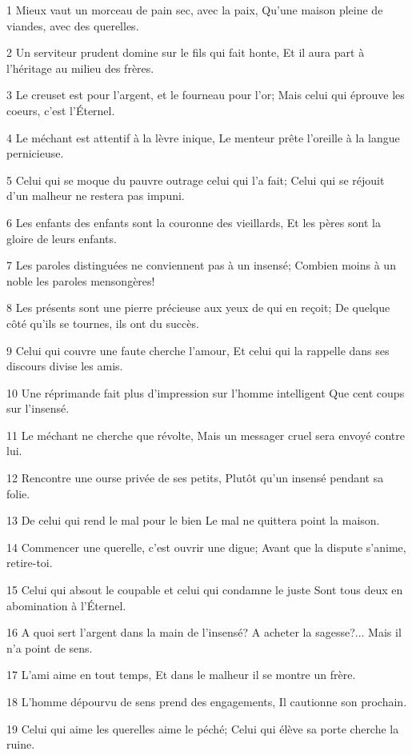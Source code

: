 \par 1 Mieux vaut un morceau de pain sec, avec la paix, Qu'une maison pleine de viandes, avec des querelles.
\par 2 Un serviteur prudent domine sur le fils qui fait honte, Et il aura part à l'héritage au milieu des frères.
\par 3 Le creuset est pour l'argent, et le fourneau pour l'or; Mais celui qui éprouve les coeurs, c'est l'Éternel.
\par 4 Le méchant est attentif à la lèvre inique, Le menteur prête l'oreille à la langue pernicieuse.
\par 5 Celui qui se moque du pauvre outrage celui qui l'a fait; Celui qui se réjouit d'un malheur ne restera pas impuni.
\par 6 Les enfants des enfants sont la couronne des vieillards, Et les pères sont la gloire de leurs enfants.
\par 7 Les paroles distinguées ne conviennent pas à un insensé; Combien moins à un noble les paroles mensongères!
\par 8 Les présents sont une pierre précieuse aux yeux de qui en reçoit; De quelque côté qu'ils se tournes, ils ont du succès.
\par 9 Celui qui couvre une faute cherche l'amour, Et celui qui la rappelle dans ses discours divise les amis.
\par 10 Une réprimande fait plus d'impression sur l'homme intelligent Que cent coups sur l'insensé.
\par 11 Le méchant ne cherche que révolte, Mais un messager cruel sera envoyé contre lui.
\par 12 Rencontre une ourse privée de ses petits, Plutôt qu'un insensé pendant sa folie.
\par 13 De celui qui rend le mal pour le bien Le mal ne quittera point la maison.
\par 14 Commencer une querelle, c'est ouvrir une digue; Avant que la dispute s'anime, retire-toi.
\par 15 Celui qui absout le coupable et celui qui condamne le juste Sont tous deux en abomination à l'Éternel.
\par 16 A quoi sert l'argent dans la main de l'insensé? A acheter la sagesse?... Mais il n'a point de sens.
\par 17 L'ami aime en tout temps, Et dans le malheur il se montre un frère.
\par 18 L'homme dépourvu de sens prend des engagements, Il cautionne son prochain.
\par 19 Celui qui aime les querelles aime le péché; Celui qui élève sa porte cherche la ruine.
